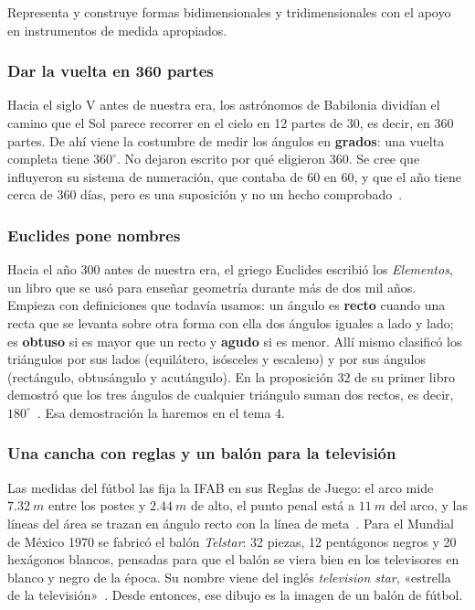 \documentclass[11pt]{article}
\begin{document}
\begin{dba}
Representa y construye formas bidimensionales y tridimensionales con el apoyo en instrumentos
de medida apropiados.
\end{dba}


\subsubsection*{Dar la vuelta en 360 partes}

Hacia el siglo V antes de nuestra era, los astrónomos de Babilonia dividían el camino que el
Sol parece recorrer en el cielo en 12 partes de 30, es decir, en 360 partes. De ahí viene la
costumbre de medir los ángulos en \textbf{grados}: una vuelta completa tiene $360^\circ$. No
dejaron escrito por qué eligieron 360. Se cree que influyeron su sistema de numeración, que
contaba de 60 en 60, y que el año tiene cerca de 360 días, pero es una suposición y no un hecho
comprobado~\cite{nrich,mactutorbab}.

\subsubsection*{Euclides pone nombres}

Hacia el año 300 antes de nuestra era, el griego Euclides escribió los \emph{Elementos}, un libro
que se usó para enseñar geometría durante más de dos mil años. Empieza con definiciones que
todavía usamos: un ángulo es \textbf{recto} cuando una recta que se levanta sobre otra forma
con ella dos ángulos iguales a lado y lado; es \textbf{obtuso} si es mayor que un recto y
\textbf{agudo} si es menor. Allí mismo clasificó los triángulos por sus lados (equilátero,
isósceles y escaleno) y por sus ángulos (rectángulo, obtusángulo y acutángulo). En la
proposición 32 de su primer libro demostró que los tres ángulos de cualquier triángulo suman
dos rectos, es decir, $180^\circ$~\cite{euclides}. Esa demostración la haremos en el tema 4.

\subsubsection*{Una cancha con reglas y un balón para la televisión}

Las medidas del fútbol las fija la IFAB en sus Reglas de Juego: el arco mide
$\qty{7,32}{m}$ entre los postes y $\qty{2,44}{m}$ de alto, el punto penal está a
$\qty{11}{m}$ del arco, y las líneas del área se trazan en ángulo recto con la línea de
meta~\cite{ifab}. Para el Mundial de México 1970 se fabricó el balón \emph{Telstar}: 32 piezas,
12 pentágonos negros y 20 hexágonos blancos, pensadas para que el balón se viera bien en los
televisores en blanco y negro de la época. Su nombre viene del inglés \emph{television star},
«estrella de la televisión»~\cite{adidas}. Desde entonces, ese dibujo es la imagen de un balón
de fútbol.
\end{document}

